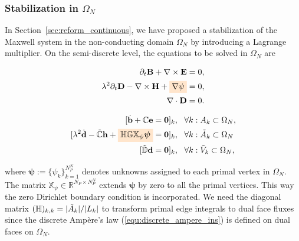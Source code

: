 \documentclass{article}
\begin{document}
\subsubsection{Stabilization in $\Omega_N$} \label{sec:reform-discrete}

In Section~\ref{sec:reform_continuous}, we have proposed a stabilization of the Maxwell
system in the non-conducting domain $\Omega_N$ by introducing a Lagrange multiplier. On
the semi-discrete level, the equations to be solved in $\Omega_N$ are
\begin{center}
    \begin{minipage}{0.3\textwidth}
    \begin{align*}
        \partial_t \mathbf{B} + \nabla \times \mathbf{E} &= 0, \\ 
        \lambda^2 \partial_t \mathbf{D} - \nabla \times \mathbf{H} + \colorbox{orange!20}{$\nabla \psi$} &= 0, \\
        \nabla \cdot \mathbf{D} &= 0. 
    \end{align*}
    \end{minipage}
    \begin{minipage}{0.1\textwidth}
    \centering
    \end{minipage}
    \begin{minipage}{0.5\textwidth}
        \begin{subequations}
        \begin{align}
            [\dot{\mathbf{b}} + \mathbb{C}\mathbf{e} &= \mathbf{0}]_k,\ \ \forall k:A_k \subset \Omega_N,\\
            [\lambda^2\dot{\mathbf{d}} - \Tilde{\mathbb{C}}\mathbf{h} + \colorbox{orange!20}{$\mathbb{H} \mathbb{G} \mathbb{X}_\psi \bm{\psi}$}&= \mathbf{0}]_k, \ \ \forall k: \Tilde{A}_k \subset \Omega_N \label{equ:discrete_ampere_ins}\\
            [\Tilde{\mathbb{D}}\mathbf{d} &= \mathbf{0}]_k,\ \ \forall k:\Tilde{V}_k \subset \Omega_N \label{equ:discrete_zero_div}, 
        \end{align} 
    \end{subequations}
    \end{minipage}
\end{center}
where $\bm{\psi} := \{\psi_k\}_{k=1}^{N_P^N}$ denotes unknowns assigned to each primal
vertex in $\Omega_N$. The matrix $\mathbb{X}_\psi \in \mathbb{R}^{N_P \times N_P^{N}}$
extends $\bm{\psi}$ by zero to all the primal vertices. This way the zero Dirichlet
boundary condition is incorporated. We need the diagonal matrix
$(\mathbb{H})_{k,k} = {|\Tilde{A}_k|}/{|L_k|}$ to transform primal edge integrals to dual
face fluxes since the discrete Amp\`{e}re's law (\ref{equ:discrete_ampere_ins}) is defined
on dual faces on $\Omega_N$.
\end{document}
